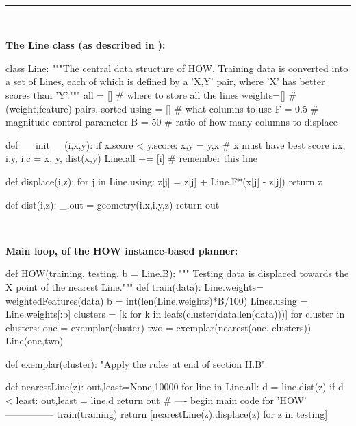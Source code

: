 

\begin{figure*} 
~\hrule~
\begin{minipage}[t]{.45\linewidth}
\scriptsize\vspace{1mm}
{\bf The Line class (as described in ):}

 
\begin{python}[left]
class Line:
  """The central data structure of HOW. Training data 
  is converted into a set of Lines, each of which is 
  defined by a 'X,Y' pair, where 'X'
  has better scores than 'Y'."""
  all   = []    # where to store all the lines
  weights=[]    # (weight,feature) pairs, sorted
  using = []    # what columns to use
  F     = 0.5   # magnitude control parameter
  B     = 50    # ratio of how many columns to displace

  def __init__(i,x,y):
    if x.score < y.score:
      x,y = y,x      # x must have best score
    i.x, i.y, i.c = x, y, dist(x,y) 
    Line.all += [i]  # remember this line

  def displace(i,z):
    for j in Line.using:
      z[j] = z[j] + Line.F*(x[j] - z[j])
    return z

  def dist(i,z):
    _,out = geometry(i.x,i.y,z)
    return out
\end{python}

~~

{\bf Main loop, of the  HOW  instance-based planner:}

\begin{python}[left]
def HOW(training, testing, b = Line.B):
  """ Testing data is displaced towards
  the X point of the nearest Line."""
  def train(data):
    Line.weights= weightedFeatures(data)
    b           = int(len(Line.weights)*B/100)
    Lines.using = Line.weights[:b]
    clusters    = [k for k in 
                   leafs(cluster(data,len(data)))]
    for cluster in clusters:
      one = exemplar(cluster)
      two = exemplar(nearest(one, clusters))
      Line(one,two)
 
  def exemplar(cluster):
    "Apply the rules at end of section II.B"
 
  def nearestLine(z):
    out,least=None,10000
    for line in Line.all:
      d = line.dist(z)
      if d < least: out,least = line,d
    return out
  # ---- begin main code for  'HOW' ---------------
  train(training)
  return [nearestLine(z).displace(z) for z in testing]
\end{python}

~~


\end{minipage}
\end{figure*}
